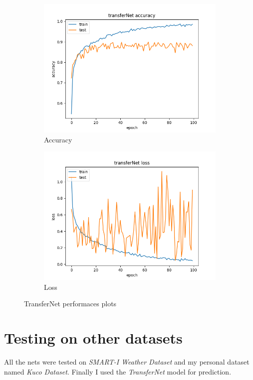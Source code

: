 \documentclass[11pt]{article}
\begin{document}
\begin{figure}[H]
	\centering
	\begin{subfigure}[b]{0.4\linewidth}
		\includegraphics[width=\linewidth]{../images/transfernet_100_epochs_accuracy.png}
		\caption{Accuracy}
	\end{subfigure}
	\begin{subfigure}[b]{0.4\linewidth}
		\includegraphics[width=\linewidth]{../images/transfernet_100_epochs_loss.png}
		\caption{Loss}
	\end{subfigure}
	\caption{TransferNet performaces plots}
	\label{fig:transfernetperformances}
\end{figure} \newpage
\section{Testing on other datasets}
All the nets were tested on \textit{SMART-I Weather Dataset} and my personal dataset named \textit{Kuco Dataset}. Finally I used the \textit{TransferNet} model for prediction.
\end{document}
